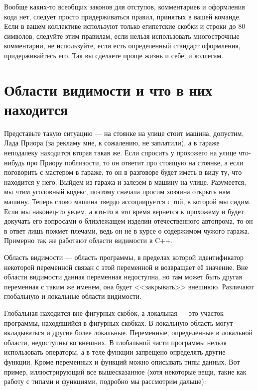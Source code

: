 \documentclass[book.tex]{subfiles}
\begin{document}
Вообще каких-то всеобщих законов для отступов, комментариев и оформления кода нет, следует просто придерживаться правил, принятых в вашей команде. Если в вашем коллективе используют только египетские скобки и строки до 80 символов, следуйте этим правилам, если нельзя использовать многострочные комментарии, не используйте, если есть определенный стандарт оформления, придерживайтесь его. Так вы сделаете проще жизнь и себе, и коллегам.

\section*{Области видимости и что в них находится}

Представьте такую ситуацию --- на стоянке на улице стоит машина, допустим, Лада Приора (за рекламу мне, к сожалению, не заплатили), а в гараже неподалеку находится вторая такая же. Если спросить у прохожего на улице что-нибудь про Приору поблизости, то он ответит про стоящую на стоянке, а если поговорить с мастером в гараже, то он в разговоре будет иметь в виду ту, что находится у него. Выйдем из гаража и залезем в машину на улице. Разумеется, мы чтим уголовный кодекс, поэтому сначала просим хозяина открыть нам машину. Теперь слово машина твердо ассоциируется с той, в которой мы сидим. Если мы наконец-то уедем, а кто-то в это время вернется к прохожему и будет докучать его вопросами о близлежащем изделии отечественного автопрома, то он в ответ лишь пожмет плечами, ведь он не в курсе о содержимом чужого гаража. Примерно так же работают области видимости в C++.

Область видимости --- область программы, в пределах которой идентификатор некоторой переменной связан с этой переменной и возвращает её значение. Вне области видимости данная переменная недоступна, но там может быть другая переменная с таким же именем, она будет <<закрывать>> внешнюю. Различают глобальную и локальные области видимости. 

Глобальная находится вне фигурных скобок, а локальная --- это участок программы, находящийся в фигурных скобках. В локальную область могут вкладываться и другие более локальные. Переменные, определенные в локальной области, недоступны во внешних. В глобальной части программы нельзя использовать операторы, а в теле функции запрещено определять другие функции. Кроме переменных и функций можно описывать типы данных. Вот пример, иллюстрирующий все вышесказанное (хотя некоторые вещи, такие как работу с типами и функциями, подробно мы рассмотрим дальше):
\end{document}
